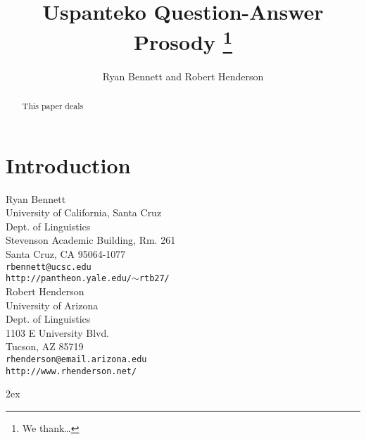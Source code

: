 \documentclass[12pt]{article}
\title{Uspanteko Question-Answer Prosody
\thanks{We thank\ldots}
}
\author{Ryan Bennett and Robert Henderson}
\date{}
\newcommand{\nrm}[1]{\textnormal{#1}}
\begin{document}
\RaggedRight
\maketitle
\setcounter{endnote}{0} %
\renewcommand{\theendnote}{\arabic{endnote}} %
\begin{abstract}
\noindent
This paper deals 
\end{abstract}




\newcommand{\scat}{{\sc SubCat}}
\newcommand{\wmin}{{\omega\nrm{\scriptsize\sc -Min}}}
\newcommand{\wmax}{{\omega\nrm{\scriptsize\sc -Max}}}
\newcommand{\wnonmin}{{\omega\nrm{\scriptsize\sc -NonMin}}}
\newcommand{\wnonmax}{{\omega\nrm{\scriptsize\sc -NonMax}}}

\section{Introduction}
\label{introduction}


\newpage
\noindent
Ryan Bennett\\
University of California, Santa Cruz\\
Dept. of Linguistics\\
Stevenson Academic Building, Rm. 261\\
Santa Cruz, CA 95064-1077\\
\texttt{rbennett@ucsc.edu}\\
\texttt{http://pantheon.yale.edu/$\sim$rtb27/}\\


\noindent
Robert Henderson\\
University of Arizona\\
Dept. of Linguistics\\
1103 E University Blvd.\\
Tucson, AZ 85719\\
\texttt{rhenderson@email.arizona.edu}\\
\texttt{http://www.rhenderson.net/}


\newpage
\begingroup
\parindent 0pt
\parskip 2ex
\def\enotesize{\normalsize}
\theendnotes
\endgroup
\end{document}

